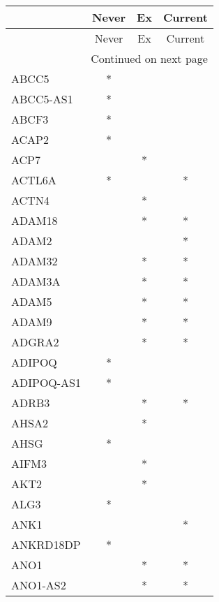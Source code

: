 \begin{longtable}{lccc}
\toprule
{} & Never & Ex & Current \\
\midrule
\endfirsthead

\toprule
{} & Never & Ex & Current \\
\midrule
\endhead
\midrule
\multicolumn{4}{r}{{Continued on next page}} \\
\midrule
\endfoot

\bottomrule
\endlastfoot
ABCC5            &     * &    &         \\
ABCC5-AS1        &     * &    &         \\
ABCF3            &     * &    &         \\
ACAP2            &     * &    &         \\
ACP7             &       &  * &         \\
ACTL6A           &     * &    &       * \\
ACTN4            &       &  * &         \\
ADAM18           &       &  * &       * \\
ADAM2            &       &    &       * \\
ADAM32           &       &  * &       * \\
ADAM3A           &       &  * &       * \\
ADAM5            &       &  * &       * \\
ADAM9            &       &  * &       * \\
ADGRA2           &       &  * &       * \\
ADIPOQ           &     * &    &         \\
ADIPOQ-AS1       &     * &    &         \\
ADRB3            &       &  * &       * \\
AHSA2            &       &  * &         \\
AHSG             &     * &    &         \\
AIFM3            &       &  * &         \\
AKT2             &       &  * &         \\
ALG3             &     * &    &         \\
ANK1             &       &    &       * \\
ANKRD18DP        &     * &    &         \\
ANO1             &       &  * &       * \\
ANO1-AS2         &       &  * &       * \\

\end{longtable}
